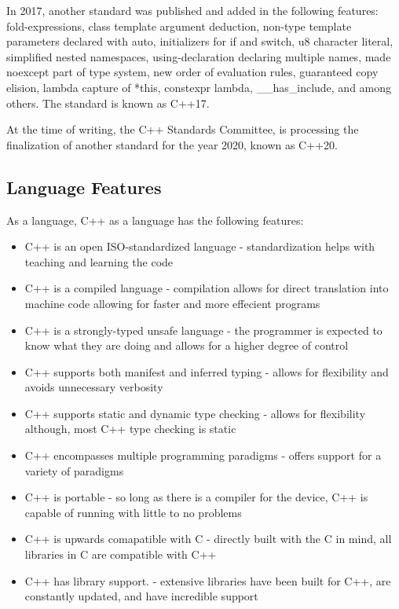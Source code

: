 \documentclass[12pt]{article}
\begin{document}
In 2017, another standard was published and added in the following features: fold-expressions, class template argument deduction, non-type template parameters declared with auto, initializers for if and switch, u8 character literal, simplified nested namespaces, using-declaration declaring multiple names, made noexcept part of type system, new order of evaluation rules, guaranteed copy elision, lambda capture of *this, constexpr lambda, \_\_has\_include, and among others. The standard is known as C++17.

At the time of writing, the C++ Standards Committee, is processing the finalization of another standard for the year 2020, known as C++20.

\subsection{Language Features}
As a language, C++ as a language has the following features:
\begin{itemize}
  \item C++ is an open ISO-standardized language - standardization helps with teaching and learning the code
  \item C++ is a compiled language - compilation allows for direct translation into machine code allowing for faster and more effecient programs
  \item C++ is a strongly-typed unsafe language - the programmer is expected to know what they are doing and allows for a higher degree of control
  \item C++ supports both manifest and inferred typing - allows for flexibility and avoids unnecessary verbosity
  \item C++ supports static and dynamic type checking - allows for flexibility although, most C++ type checking is static
  \item C++ encompasses multiple programming paradigms - offers support for a variety of paradigms
  \item C++ is portable - so long as there is a compiler for the device, C++ is capable of running with little to no problems
  \item C++ is upwards comapatible with C - directly built with the C in mind, all libraries in C are compatible with C++
  \item C++ has library support. - extensive libraries have been built for C++, are constantly updated, and have incredible support
\end{itemize}
\end{document}
